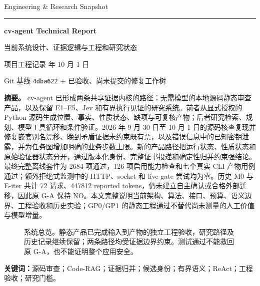 \documentclass[UTF8,a4paper,zihao=5,fontset=none]{ctexart}
\newcommand{\code}[1]{{\small\nolinkurl{#1}}}
\begin{document}
\thispagestyle{plain}
\hfill{\small Engineering \& Research Snapshot}
\vspace{1mm}\hrule\vspace{6mm}
\begin{center}
{\LARGE\bfseries cv-agent Technical Report}\par\vspace{3mm}
{\large 当前系统设计、证据逻辑与工程和研究状态}\par\vspace{3mm}
{\small 项目工程记录 年 10 月 1 日}\par
{\footnotesize Git 基线 \code{4dba622} + 已验收、尚未提交的修复工作树}
\end{center}
\vspace{2mm}
\noindent\textbf{摘要。}
cv-agent 已形成两条共享证据内核的路径：无需模型的本地源码静态审查产品，以及保留 E1--E5、Jev 和有界执行见证的研究系统。前者从显式授权的 Python 源码生成位置、事实、性质状态、缺项与可复核产物；后者研究检索、规划、模型工具循环和条件验证。2026 年 9 月 30 日至 10 月 1 日的源码核查复现并修复嵌套别名漂移、晚到矛盾证据未约束既有票，以及错误信息中的已知密钥泄露，并为任务图增加明确的业务步数上限。新的产品路径把运行状态、性质状态和原始验证器状态分开，通过版本化身份、完整证书投递和确定性归并约束强结论。最终完整离线套件为 2684 项通过，126 项启用能力检查和七个真实 CLI 产物用例通过；额外拒绝式监测中的 HTTP、socket 和 live gate 尝试均为零。历史 M0 与 E-iter 共计 72 请求、447812 reported tokens，仍未建立自主确认或合格外部迁移，因此原 G-A 保持 NO。本文完整说明当前架构、算法、接口、预算、语义边界、工程验收和历史实验；GP0/GP1 的静态工程通过不替代尚未测量的人工价值与模型增量。

\begin{figure}[htbp]
\centering
{}
\caption{系统总览。静态产品已完成输入到产物的独立工程验收，研究路径及历史记录继续保留；两条路径均受证据边界约束。测试通过不能救回原 G-A，也不能证明整个应用安全。}
\label{fig:teaser}
\end{figure}
\noindent\textbf{关键词：}源码审查；Code-RAG；证据归并；候选身份；有界语义；ReAct；工程验收；研究门槛。
\clearpage
\tableofcontents
\clearpage
\end{document}
